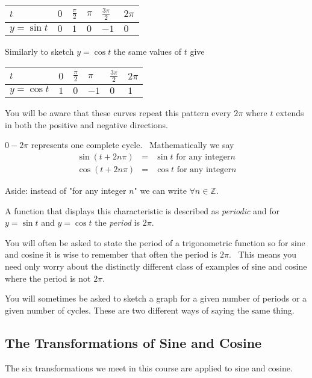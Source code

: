 \begin{tabular}[c]{|l|l|l|l|l|l|}\hline
$t$  & $0$  & $\frac{\pi }{2}$  & $\pi $  & $\frac{3 \pi }{2}$  & $2 \pi $  \\
\hline
$y =\sin  t$  & $0$  & $1$  & $0$  & $ -1$  & $0$  \\
\hline
\end{tabular}

Similarly to sketch $y =\cos  t$ the same values of $t$ give 


\begin{tabular}[c]{|l|l|l|l|l|l|}\hline
$t$  & $0$  & $\frac{\pi }{2}$  & $\pi $  & $\frac{3 \pi }{2}$  & $2 \pi $  \\
\hline
$y =\cos  t$  & $1$  & $0$  & $ -1$  & $0$  & $1$  \\
\hline
\end{tabular}

You will be aware that these curves repeat this pattern every $2 \pi $ where $t$ extends in both the positive and negative directions. 

$0 -2 \pi $ represents one complete cycle. \ Mathematically we say
\begin{eqnarray*}\sin  \left (t +2 n \pi \right ) &  = & \sin  t\text{\ \ \ for any integer}n \\
\cos  \left (t +2 n \pi \right ) &  = & \cos  t\text{\ \ \ for any integer}n\end{eqnarray*}

Aside: instead of "for any integer $n$" we can write $ \forall n \in \mathbb{Z}$. 

A function that displays this characteristic is described as \emph{periodic} and for $y =\sin  t$ and $y =\cos  t$ the \emph{period} is $2 \pi $. 

You will often be asked to state the period of a trigonometric function so for sine and cosine it
is wise to remember that often the period is $2 \pi $. \ This means you need only worry about the distinctly different class of examples
of sine and cosine where the period is not $2 \pi $. 

You will sometimes be asked to sketch a graph for a given number of periods or a given number of cycles. These are two different ways of saying the same thing. 

\subsection{The Transformations of Sine and Cosine}
The six transformations we meet in this course are applied to sine and cosine. 

